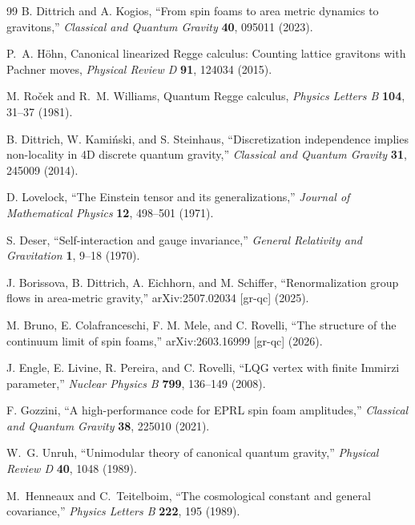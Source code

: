 \documentclass[11pt]{article}
\begin{document}
\begin{thebibliography}{99}
B. Dittrich and A. Kogios,
``From spin foams to area metric dynamics to gravitons,''
\emph{Classical and Quantum Gravity} \textbf{40}, 095011 (2023).

P.~A. H\"ohn,
Canonical linearized Regge calculus: Counting lattice gravitons with
Pachner moves,
\emph{Physical Review D} \textbf{91}, 124034 (2015).

M. Ro\v{c}ek and R.~M. Williams,
Quantum Regge calculus,
\emph{Physics Letters B} \textbf{104}, 31--37 (1981).

B. Dittrich, W. Kami\'nski, and S. Steinhaus,
``Discretization independence implies non-locality in 4D discrete quantum gravity,''
\emph{Classical and Quantum Gravity} \textbf{31}, 245009 (2014).

D. Lovelock,
``The Einstein tensor and its generalizations,''
\emph{Journal of Mathematical Physics} \textbf{12}, 498--501 (1971).

S. Deser,
``Self-interaction and gauge invariance,''
\emph{General Relativity and Gravitation} \textbf{1}, 9--18 (1970).

J. Borissova, B. Dittrich, A. Eichhorn, and M. Schiffer,
``Renormalization group flows in area-metric gravity,''
arXiv:2507.02034 [gr-qc] (2025).

M. Bruno, E. Colafranceschi, F. M. Mele, and C. Rovelli,
``The structure of the continuum limit of spin foams,''
arXiv:2603.16999 [gr-qc] (2026).

J. Engle, E. Livine, R. Pereira, and C. Rovelli,
``LQG vertex with finite Immirzi parameter,''
\emph{Nuclear Physics B} \textbf{799}, 136--149 (2008).

F. Gozzini,
``A high-performance code for EPRL spin foam amplitudes,''
\emph{Classical and Quantum Gravity} \textbf{38}, 225010 (2021).


W.~G. Unruh,
``Unimodular theory of canonical quantum gravity,''
\emph{Physical Review D} \textbf{40}, 1048 (1989).

M.~Henneaux and C.~Teitelboim,
``The cosmological constant and general covariance,''
\emph{Physics Letters B} \textbf{222}, 195 (1989).


\end{thebibliography}
\end{document}
